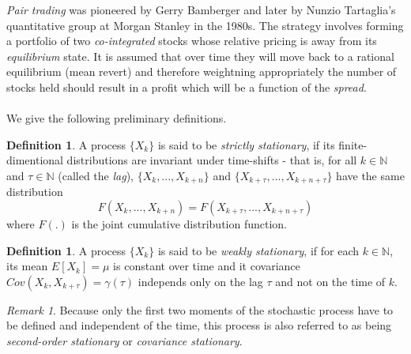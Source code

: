 \documentclass{article}
\theoremstyle{definition}
\newtheorem{definition}[thm]{Definition}
\theoremstyle{remark}
\newtheorem{remark}[thm]{Remark}
\newcommand{\measure}[1]{\ensuremath{\mathbb{#1}}}
\begin{document}
\emph{Pair trading} was pioneered by Gerry Bamberger and later by Nunzio Tartaglia's quantitative group at Morgan Stanley in the 1980s. The strategy involves forming a portfolio of two \emph{co-integrated} stocks whose relative pricing is away from its \emph{equilibrium} state. It is assumed that over time they will move back to a rational equilibrium (mean revert) and therefore weightning appropriately the number of stocks held should result in a profit which will be a function of the \emph{spread}.\\%
\\
We give the following preliminary definitions.
\begin{definition} A process $\{X_k\}$ is said to be \emph{strictly stationary}, if its finite-dimentional distributions are invariant under time-shifts - that is, for all $k \in \measure{N}$ and $\tau \in \measure{N}$ (called the \emph{lag}), $\{X_{k},...,X_{k+n}\}$ and $\{X_{k+\tau},...,X_{k+n+\tau}\}$ have the same distribution
\begin{equation*}
F(X_{k},...,X_{k+n})=F(X_{k+\tau},...,X_{k+n+\tau})
\end{equation*}
where $F(.)$ is the joint cumulative distribution function.
\end{definition}


\begin{definition} A process $\{X_k\}$ is said to be \emph{weakly stationary}, if for each $k \in 
\measure{N}$, its mean $E[X_k]=\mu$ is constant over time and it covariance $Cov(X_k, X_{k+\tau})=\gamma(\tau)$ independs only on the lag $\tau$ and not on the time of $k$.
\end{definition}

\begin{remark}
Because only the first two moments of the stochastic process have to be defined and independent of the time, this process is also referred to as being \emph{second-order stationary} or \emph{covariance stationary}.
\end{remark}
\end{document}
